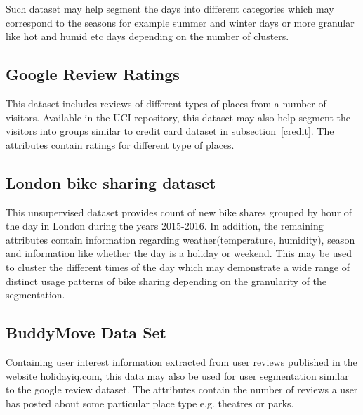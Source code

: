 \documentclass[12pt]{article}
\begin{document}
Such dataset may help segment the days into different categories which may correspond to the seasons for example summer and winter days or more granular like hot and humid etc days depending on the number of clusters.

\subsection{Google Review Ratings}
This dataset includes reviews of different types of places from a number of visitors. Available in the UCI repository, this dataset may also help segment the visitors into groups similar to credit card dataset in subsection~\ref{credit}. The attributes contain ratings for different type of places.

\subsection{London bike sharing dataset}
This unsupervised dataset provides count of new bike shares grouped by hour of the day in London during the years 2015-2016. In addition, the remaining attributes contain information regarding weather(temperature, humidity), season and information like whether the day is a holiday or weekend. This may be used to cluster the different times of the day which may demonstrate a wide range of distinct usage patterns of bike sharing depending on the granularity of the segmentation.

\subsection{BuddyMove Data Set}
Containing user interest information extracted from user reviews published in the website holidayiq.com, this data may also be used for user segmentation similar to the google review dataset. The attributes contain the number of reviews a user has posted about some particular place type e.g.  theatres or parks.
\end{document}
